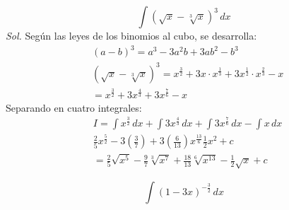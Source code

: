 \begin{problem}
    \begin{equation}
        \int \left(\sqrt{x} - \sqrt[3]{x} \right)^{3}\, dx
    \end{equation}
    \textit{ Sol. }
Según las leyes de los binomios al cubo, se desarrolla:
\begin{align*}
    &\left(a - b\right)^3 = a^3 - 3a^2b + 3ab^2 - b^3\\
    &\left(\sqrt{x} - \sqrt[3]{x}\right)^3 = x^{\frac{3}{2}} + 3x \cdot x^{\frac{1}{3}} + 3x^{\frac{1}{2}} \cdot x^{\frac{2}{3}} - x\\ 
    &= x^{\frac{3}{2}} + 3x^{\frac{4}{3}} + 3x^{\frac{7}{6}} - x
\end{align*}
Separando en cuatro integrales:
    \begin{align*}
        &I = \int x^{\frac{3}{2}}\,dx + \int 3x^{\frac{4}{3}}\,dx + \int 3x^{\frac{7}{6}}\,dx - \int x\,dx\\
        &\frac{2}{5}x^{\frac{5}{2}} - 3 \left(\frac{3}{7}\right)  + 3\left(\frac{6}{13}\right)x^{\frac{13}{6}} \frac{1}{2}x^2 + c\\
        &= \frac{2}{5} \sqrt{x^5} - \frac{9}{7}\sqrt[3]{x^7} + \frac{18}{13} \sqrt[6]{x^{13}} - \frac{1}{2}\sqrt{x} + c
    \end{align*}
\end{problem}


\begin{problem}
    \begin{equation}
        \int \left(1 - 3x\right)^{ - \frac{3}{2}} \, dx
    \end{equation}
\end{problem}


